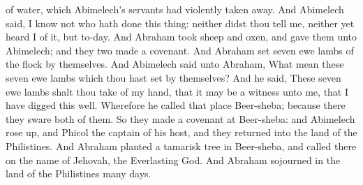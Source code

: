 of water, which Abimelech’s servants had violently taken away. And Abimelech said, I know not who hath done this thing: neither didst thou tell me, neither yet heard I of it, but to-day. And Abraham took sheep and oxen, and gave them unto Abimelech; and they two made a covenant. And Abraham set seven ewe lambs of the flock by themselves. And Abimelech said unto Abraham, What mean these seven ewe lambs which thou hast set by themselves? And he said, These seven ewe lambs shalt thou take of my hand, that it may be a witness unto me, that I have digged this well. Wherefore he called that place Beer-sheba; because there they sware both of them. So they made a covenant at Beer-sheba: and Abimelech rose up, and Phicol the captain of his host, and they returned into the land of the Philistines. And Abraham planted a tamarisk tree in Beer-sheba, and called there on the name of Jehovah, the Everlasting God. And Abraham sojourned in the land of the Philistines many days. 

